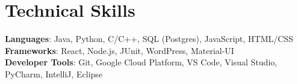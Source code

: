 \documentclass[letterpaper,12pt]{article} %
\begin{document}
\section{Technical Skills}
 \begin{itemize}[leftmargin=0.15in, label={}]
    \small{\item{
     \textbf{Languages}{: Java, Python, C/C++, SQL (Postgres), JavaScript, HTML/CSS} \\
     \textbf{Frameworks}{: React, Node.js, JUnit, WordPress, Material-UI} \\
     \textbf{Developer Tools}{: Git, Google Cloud Platform, VS Code, Visual Studio, PyCharm, IntelliJ, Eclipse} \\
    }}
 \end{itemize}

\end{document}
